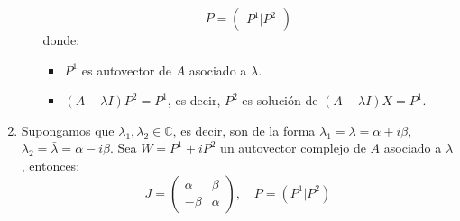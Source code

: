 \begin{enumerate}
\begin{enumerate}
$$                        P = \begin{pmatrix}
                            P^1 | P^2
                        \end{pmatrix}$$
                    donde:
                    \begin{itemize}
                        \item $P^1$ es autovector de $A$ asociado a $\lambda$.
                        \item $(A - \lambda I)P^2 = P^1$, es decir, $P^2$ es solución de $(A - \lambda I)X = P^1$.
                    \end{itemize}
          \end{enumerate}
    \item Supongamos que $\lambda_1, \lambda_2 \in \mathbb{C}$, es decir, son de la forma $\lambda_1 = \lambda = \alpha + i\beta$, $\lambda_2 = \bar{\lambda} = \alpha - i\beta$.
          Sea $W = P^1 + iP^2$ un autovector complejo de $A$ asociado a $\lambda$, entonces:
          $$J = \begin{pmatrix}
                  \alpha & \beta  \\
                  -\beta & \alpha
              \end{pmatrix}, \quad
              P = (P^1 | P^2)$$
\end{enumerate}

